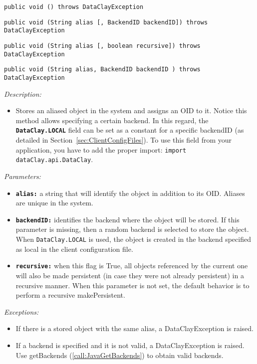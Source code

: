 \begin{dBox}
\texttt{public void  () throws DataClayException}

\texttt{public void  (String alias [, BackendID backendID]) \newline throws DataClayException}

\texttt{public void  (String alias [, boolean recursive]) \newline throws DataClayException}

\texttt{public void  (String alias, BackendID backendID
) throws DataClayException}
\LINE

{\it Description:}

\begin{itemize}
    \item Stores an aliased object in the system and assigns an OID to it. Notice this method allows specifying a certain backend. In this regard, the \colorbox{basecolor!15}{\texttt{\bfseries DataClay.LOCAL}} field can be set as a constant for a specific backendID (as detailed in Section~\ref{sec:ClientConfigFiles}). To use this field from your application, you have to add the proper import: \colorbox{basecolor!15}{\texttt{import dataClay.api.DataClay}}.
\end{itemize}

{\it Parameters:}

\begin{itemize}
    \item \texttt{\bfseries alias:} a string that will identify the object in addition to its OID. Aliases are unique in the system.
    \item \texttt{\bfseries backendID:} identifies the backend where the object will be stored. If this parameter is missing, then a random backend is selected to store the object. When \texttt{DataClay.LOCAL} is used, the object is created in the backend specified as local in the client configuration file.
    \item \texttt{\bfseries recursive:} when this flag is True, all objects referenced by the current one will also be made persistent (in case they were not already persistent) in a recursive manner. When this parameter is not set, the default behavior is to perform a recursive makePersistent.
\end{itemize}

{\it Exceptions:}

\begin{itemize}
    \item If there is a stored object with the same alias, a DataClayException is raised.
    \item If a backend is specified and it is not valid, a DataClayException is raised. Use getBackends (\ref{call:JavaGetBackends}) to obtain valid backends.
\end{itemize}

\end{dBox}

